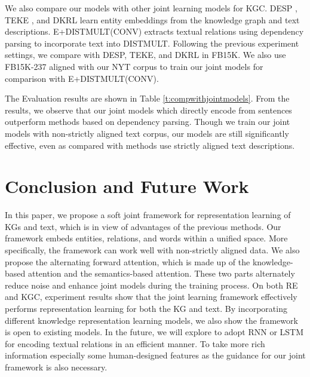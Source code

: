 \documentclass[letterpaper]{article} %
\begin{document}
We also compare our models with other joint learning models for KGC. DESP \cite{zhong2015aligning}, TEKE \cite{wang2016text}, and DKRL \cite{xie2016representation} learn entity embeddings from the knowledge graph and text descriptions. E+DISTMULT(CONV) \cite{toutanova2015representing} extracts textual relations using dependency parsing to incorporate text into DISTMULT. Following the previous experiment settings, we compare with DESP, TEKE, and DKRL in FB15K. We also use FB15K-237 aligned with our NYT corpus to train our joint models for comparison with E+DISTMULT(CONV).

The Evaluation results are shown in Table \ref{t:compwithjointmodels}. From the results, we observe that our joint models which directly encode from sentences outperform methods based on dependency parsing. Though we train our joint models with non-strictly aligned text corpus, our models are still significantly effective, even as compared with methods use strictly aligned text descriptions.

\section{Conclusion and Future Work}

In this paper, we propose a soft joint framework for representation learning of KGs and text, which is in view of advantages of the previous methods. Our framework embeds entities, relations, and words within a unified space. More specifically, the framework can work well with non-strictly aligned data. We also propose the alternating forward attention, which is made up of the knowledge-based attention and the semantics-based attention. These two parts alternately reduce noise and enhance joint models during the training process. On both RE and KGC, experiment results show that the joint learning framework effectively performs representation learning for both the KG and text. By incorporating different knowledge representation learning models, we also show the framework is open to existing models. In the future, we will explore to adopt RNN or LSTM for encoding textual relations in an efficient manner. To take more rich information especially some human-designed features as the guidance for our joint framework is also necessary.









\end{document}

